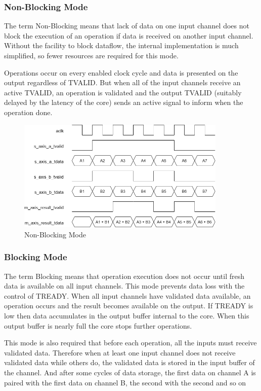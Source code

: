 \documentclass[a4paper, 12pt]{report}
\begin{document}
\subsubsection{Non-Blocking Mode}
The term Non-Blocking means that lack of data on one input channel does not block the execution of an operation if data is received on another input channel. Without the facility to block dataflow, the internal implementation is much simplified, so fewer resources are required for this mode.

Operations occur on every enabled clock cycle and data is presented on the output regardless of TVALID. But when all of the input channels receive an active TVALID, an operation is validated and the output TVALID (suitably delayed by the latency of the core) sends an active signal to inform when the operation done. 

\begin{figure}[H]
    \centering
    \includegraphics[width = 10cm]{picture/IP Catalog/floating/ip-Page-2.drawio.png}
    \caption{Non-Blocking Mode}
    \medskip
\end{figure}

\subsubsection{Blocking Mode}
The term Blocking means that operation execution does not occur until fresh data is available on all input channels. This mode prevents data loss with the control of TREADY. When all input channels have validated data available, an operation occurs and the result becomes available on the output. If TREADY is low then data accumulates in the output buffer internal to the core. When this output buffer is nearly full the core stops further operations.

This mode is also required that before each operation, all the inputs must receive validated data. Therefore when at least one input channel does not receive validated data while others do, the validated data is stored in the input buffer of the channel. And after some cycles of data storage, the first data on channel A is paired with the first data on channel B, the second with the second and so on
\end{document}
